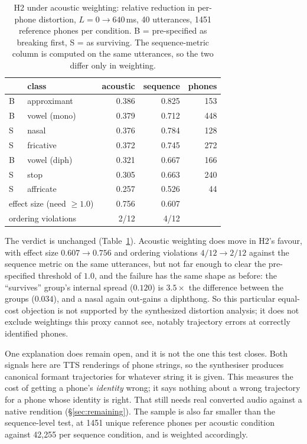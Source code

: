 \documentclass[journal]{IEEEtran}
\begin{document}
\begin{table}[t]
\centering\small
\caption{H2 under acoustic weighting: relative reduction in per-phone
distortion, $L{=}0\rightarrow640$\,ms, 40 utterances, 1451 reference phones per
condition. B = pre-specified as breaking first, S = as surviving. The
sequence-metric column is computed on the same utterances, so the two differ
only in weighting.}
\label{tab:h2audio}
\begin{tabular}{llrrr}
\toprule
& class & acoustic & sequence & phones \\
\midrule
B & approximant  & 0.386 & 0.825 & 153 \\
B & vowel (mono) & 0.379 & 0.712 & 448 \\
S & nasal        & 0.376 & 0.784 & 128 \\
S & fricative    & 0.372 & 0.745 & 272 \\
B & vowel (diph) & 0.321 & 0.667 & 166 \\
S & stop         & 0.305 & 0.663 & 240 \\
S & affricate    & 0.257 & 0.526 & 44 \\
\midrule
\multicolumn{2}{l}{effect size (need $\geq1.0$)} & 0.756 & 0.607 & \\
\multicolumn{2}{l}{ordering violations} & 2/12 & 4/12 & \\
\bottomrule
\end{tabular}
\end{table}

The verdict is unchanged (Table~\ref{tab:h2audio}). Acoustic weighting does move
in H2's favour, with effect size $0.607 \rightarrow 0.756$ and ordering
violations $4/12 \rightarrow 2/12$ against the sequence metric on the same
utterances, but not far enough to clear the pre-specified threshold of $1.0$, and the
failure has the same shape as before: the ``survives'' group's internal spread
($0.120$) is $3.5\times$ the difference between the groups ($0.034$), and a
nasal again out-gains a diphthong. So this particular equal-cost objection is not supported by the synthesized
distortion analysis; it does not exclude weightings this proxy cannot see,
notably trajectory errors at correctly identified phones.



One explanation does remain open, and it is not the one this test closes. Both
signals here are TTS renderings of phone strings, so the synthesiser produces
canonical formant trajectories for whatever string it is given. This measures
the cost of getting a phone's \emph{identity} wrong; it says nothing about a
wrong trajectory for a phone whose identity is right. That still needs real
converted audio against a native rendition (\S\ref{sec:remaining}). The sample
is also far smaller than the sequence-level test, at 1451 unique reference
phones per acoustic condition against 42{,}255 per sequence condition, and
is weighted accordingly.
\end{document}
